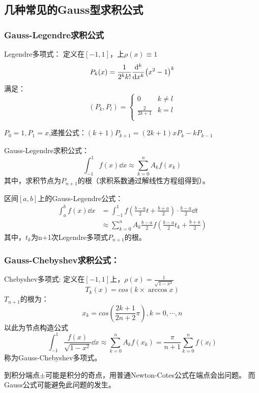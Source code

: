 \subsection{几种常见的Gauss型求积公式}

\subsubsection{Gauss-Legendre求积公式}

Legendre多项式：
定义在$[-1,1]$，上$\rho(x)\equiv 1$
\begin{equation*}
    P_k(x) = \frac{1}{2^kk!}\dv[k]{x}(x^2-1)^k
\end{equation*}
满足：
\begin{equation*}
    (P_k,P_l) = 
    \begin{cases}
        0& k\neq l \\
        \frac{2}{2k+1}& k=l\\
    \end{cases}
\end{equation*}

$P_0 = 1,P_1 = x$,递推公式：$(k+1)P_{k+1} = (2k+1)xP_k-kP_{k-1}$

Gauss-Legendre求积公式：
\begin{equation*}
    \int_{-1}^{1}f(x)\dd{x} \approx \sum_{k=0}^{n}A_kf(x_k)
\end{equation*}
其中，求积节点为$P_{n+1}$的根（求积系数通过解线性方程组得到）。

区间$[a,b]$上的Gauss-Legendre公式：
\begin{align*}
    \int_{a}^{b}f(x)\dd{x} &= \int_{-1}^{1}f(\frac{b-a}{2}t+\frac{b+a}{2})\cdot \frac{b-a}{2}\dd{t}\\
    &\approx\sum_{k=0}^{n}A_k\frac{b-a}{2}f(\frac{b-a}{2}t_k+\frac{b+a}{2})
\end{align*}
其中，$t_k$为n+1次Legendre多项式$P_{n+1}$的根。

\subsubsection{Gauss-Chebyshev求积公式：}

Chebyshev多项式:
定义在$[-1,1]$上，$\rho(x) = \frac{1}{\sqrt{1-x^2}}$
\begin{equation*}
    T_k(x) = cos(k \times \arccos{x})
\end{equation*}
$T_{n+1}$的根为：
\begin{equation*}
    x_k = cos(\frac{2k+1}{2n+2}\pi ), k = 0,\cdots, n
\end{equation*}
以此为节点构造公式
\begin{equation*}
    \int_{-1}^{1}\frac{f(x)}{\sqrt{1-x^2}}\dd{x} \approx \sum_{k=0}^{n}A_kf(x_k) = \frac{\pi}{n+1}\sum_{k=0}^{n}f(x_l)
\end{equation*}
称为Gauss-Chebyshev多项式。
\begin{notice}
    到积分端点$\pm $可能是积分的奇点，用普通Newton-Cotes公式在端点会出问题。
    而Gauss公式可能避免此问题的发生。
\end{notice}

